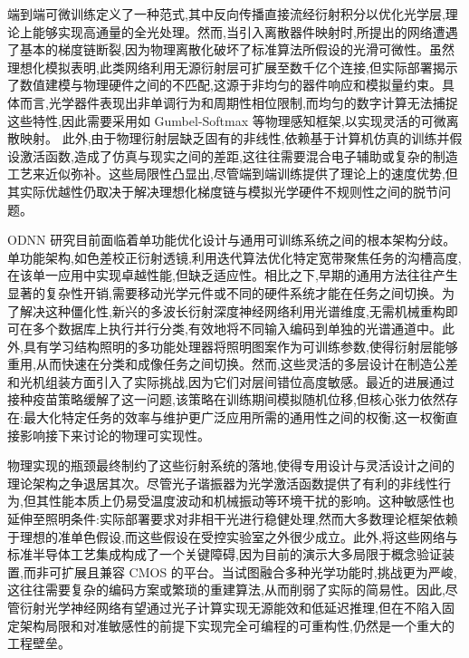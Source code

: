 \documentclass[11pt]{article}
\begin{document}
端到端可微训练定义了一种范式,其中反向传播直接流经衍射积分以优化光学层,理论上能够实现高通量的全光处理。然而,当引入离散器件映射时,所提出的网络遭遇了基本的梯度链断裂,因为物理离散化破坏了标准算法所假设的光滑可微性。虽然理想化模拟表明,此类网络利用无源衍射层可扩展至数千亿个连接,但实际部署揭示了数值建模与物理硬件之间的不匹配,这源于非均匀的器件响应和模拟量约束。具体而言,光学器件表现出非单调行为和周期性相位限制,而均匀的数字计算无法捕捉这些特性,因此需要采用如 Gumbel-Softmax 等物理感知框架,以实现灵活的可微离散映射。\citep{doi_10_1145_3508352_3549378_13c53996} 此外,由于物理衍射层缺乏固有的非线性,依赖基于计算机仿真的训练并假设激活函数,造成了仿真与现实之间的差距,这往往需要混合电子辅助或复杂的制造工艺来近似弥补。这些局限性凸显出,尽管端到端训练提供了理论上的速度优势,但其实际优越性仍取决于解决理想化梯度链与模拟光学硬件不规则性之间的脱节问题。\citep{doi_10_1145_3508352_3549378_13c53996} \citep{doi_10_1126_science_aat8084_e055772d} \citep{doi_10_1109_dac56929_2023_10247715_f78d6713} \citep{doi_10_1126_sciadv_adu0904_786138ff}

ODNN 研究目前面临着单功能优化设计与通用可训练系统之间的根本架构分歧。单功能架构,如色差校正衍射透镜,利用迭代算法优化特定宽带聚焦任务的沟槽高度,在该单一应用中实现卓越性能,但缺乏适应性。相比之下,早期的通用方法往往产生显著的复杂性开销,需要移动光学元件或不同的硬件系统才能在任务之间切换。为了解决这种僵化性,新兴的多波长衍射深度神经网络利用光谱维度,无需机械重构即可在多个数据库上执行并行分类,有效地将不同输入编码到单独的光谱通道中。此外,具有学习结构照明的多功能处理器将照明图案作为可训练参数,使得衍射层能够重用,从而快速在分类和成像任务之间切换。然而,这些灵活的多层设计在制造公差和光机组装方面引入了实际挑战,因为它们对层间错位高度敏感。最近的进展通过接种疫苗策略缓解了这一问题,该策略在训练期间模拟随机位移,但核心张力依然存在:最大化特定任务的效率与维护更广泛应用所需的通用性之间的权衡,这一权衡直接影响接下来讨论的物理可实现性。\citep{doi_10_1038_srep21545_ae20cc7d} \citep{doi_10_1515_nanoph_2022_0615_9a3be8d6} \citep{doi_10_1364_ol_591818_8738c4b1} \citep{doi_10_1515_nanoph_2020_0291_c4a9f42d}

物理实现的瓶颈最终制约了这些衍射系统的落地,使得专用设计与灵活设计之间的理论架构之争退居其次。尽管光子谐振器为光学激活函数提供了有利的非线性行为,但其性能本质上仍易受温度波动和机械振动等环境干扰的影响。这种敏感性也延伸至照明条件:实际部署要求对非相干光进行稳健处理,然而大多数理论框架依赖于理想的准单色假设,而这些假设在受控实验室之外很少成立。此外,将这些网络与标准半导体工艺集成构成了一个关键障碍,因为目前的演示大多局限于概念验证装置,而非可扩展且兼容 CMOS 的平台。当试图融合多种光学功能时,挑战更为严峻,这往往需要复杂的编码方案或繁琐的重建算法,从而削弱了实际的简易性。因此,尽管衍射光学神经网络有望通过光子计算实现无源能效和低延迟推理,但在不陷入固定架构局限和对准敏感性的前提下实现完全可编程的可重构性,仍然是一个重大的工程壁垒。\citep{doi_10_3390_nano14080697_c372a140} \citep{doi_10_1364_oe_523619_ddeb1b53} \citep{doi_10_1038_s41467_022_28702_0_1b79b43c} \citep{doi_10_1364_optica_583686_6b84680e} \citep{doi_10_1002_lpor_202200348_d54cae18}
\end{document}
